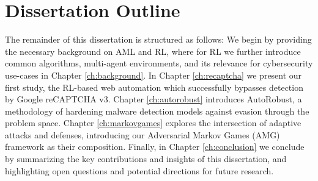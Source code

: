 
\section{Dissertation Outline}

The remainder of this dissertation is structured as follows:
We begin by providing the necessary background on \gls{AML} and \gls{RL}, where for \gls{RL} we further introduce common algorithms, multi-agent environments, and its relevance for cybersecurity use-cases in Chapter \ref{ch:background}.
In Chapter \ref{ch:recaptcha} we present our first study, the RL-based web automation which successfully bypasses detection by Google reCAPTCHA v3.
Chapter \ref{ch:autorobust} introduces AutoRobust, a methodology of hardening malware detection models against evasion through the problem space.
Chapter \ref{ch:markovgames} explores the intersection of adaptive attacks and defenses, introducing our Adversarial Markov Games (AMG) framework as their composition.
Finally, in Chapter \ref{ch:conclusion} we conclude by summarizing the key contributions and insights of this dissertation, and highlighting open questions and potential directions for future research.

\cleardoublepage

